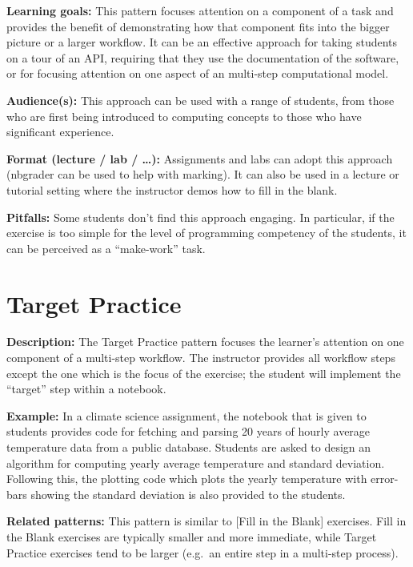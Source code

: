 \documentclass[]{book}
\begin{document}
\textbf{Learning goals:} This pattern focuses attention on a component
of a task and provides the benefit of demonstrating how that component
fits into the bigger picture or a larger workflow. It can be an
effective approach for taking students on a tour of an API, requiring
that they use the documentation of the software, or for focusing
attention on one aspect of an multi-step computational model.

\textbf{Audience(s):} This approach can be used with a range of
students, from those who are first being introduced to computing
concepts to those who have significant experience.

\textbf{Format (lecture / lab / \ldots{}):} Assignments and labs can
adopt this approach (nbgrader can be used to help with marking). It can
also be used in a lecture or tutorial setting where the instructor demos
how to fill in the blank.

\textbf{Pitfalls:} Some students don't find this approach engaging. In
particular, if the exercise is too simple for the level of programming
competency of the students, it can be perceived as a ``make-work'' task.

\hypertarget{target-practice}{\section{Target
Practice}\label{target-practice}}

\textbf{Description:} The Target Practice pattern focuses the learner's
attention on one component of a multi-step workflow. The instructor
provides all workflow steps except the one which is the focus of the
exercise; the student will implement the ``target'' step within a
notebook.

\textbf{Example:} In a climate science assignment, the notebook that is
given to students provides code for fetching and parsing 20 years of
hourly average temperature data from a public database. Students are
asked to design an algorithm for computing yearly average temperature
and standard deviation. Following this, the plotting code which plots
the yearly temperature with error-bars showing the standard deviation is
also provided to the students.

\textbf{Related patterns:} This pattern is similar to {[}Fill in the
Blank{]} exercises. Fill in the Blank exercises are typically smaller
and more immediate, while Target Practice exercises tend to be larger
(e.g.~an entire step in a multi-step process).
\end{document}
